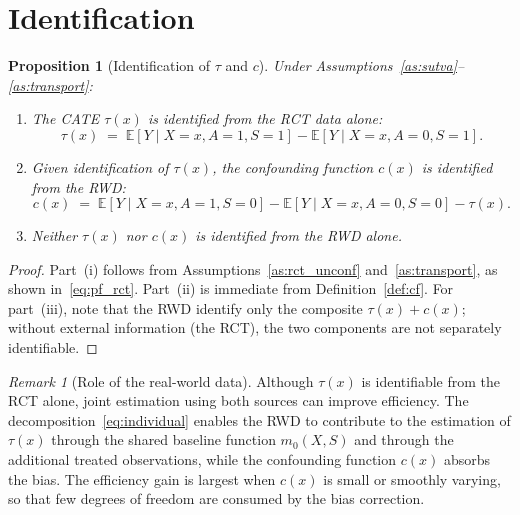 \documentclass[11pt]{article}
\theoremstyle{plain}
\theoremstyle{definition}
\theoremstyle{remark}
\newcommand{\E}{\mathbb{E}}
\newcommand{\1}{\mathds{1}}
\theoremstyle{plain}
\newtheorem{proposition}{Proposition}
\theoremstyle{remark}
\newtheorem{remark}{Remark}
\newcommand{\CATE}{\tau}
\newcommand{\cf}{c}
\begin{document}
\section{Identification}

\begin{proposition}[Identification of $\CATE$ and $\cf$]\label{prop:ident}
  Under Assumptions~\ref{as:sutva}--\ref{as:transport}:
  \begin{enumerate}
    \item[\emph{(i)}] The CATE $\CATE(x)$ is identified from the RCT data alone:
    \begin{equation}\label{eq:ident_tau}
      \CATE(x) \;=\; \E[Y \mid X{=}x, A{=}1, S{=}1] - \E[Y \mid X{=}x, A{=}0, S{=}1].
    \end{equation}
    \item[\emph{(ii)}] Given identification of $\CATE(x)$, the confounding function $\cf(x)$ is identified from the RWD:
    \begin{equation}\label{eq:ident_c}
      \cf(x) \;=\; \E[Y \mid X{=}x, A{=}1, S{=}0] - \E[Y \mid X{=}x, A{=}0, S{=}0] - \CATE(x).
    \end{equation}
    \item[\emph{(iii)}] Neither $\CATE(x)$ nor $\cf(x)$ is identified from the RWD alone.
  \end{enumerate}
\end{proposition}

\begin{proof}
  Part~(i) follows from Assumptions~\ref{as:rct_unconf} and~\ref{as:transport}, as shown in~\eqref{eq:pf_rct}. Part~(ii) is immediate from Definition~\ref{def:cf}. For part~(iii), note that the RWD identify only the composite $\CATE(x) + \cf(x)$; without external information (the RCT), the two components are not separately identifiable.
\end{proof}

\begin{remark}[Role of the real-world data]
  Although $\CATE(x)$ is identifiable from the RCT alone, joint estimation using both sources can improve efficiency. The decomposition~\eqref{eq:individual} enables the RWD to contribute to the estimation of $\CATE(x)$ through the shared baseline function $m_0(X,S)$ and through the additional treated observations, while the confounding function $\cf(x)$ absorbs the bias. The efficiency gain is largest when $\cf(x)$ is small or smoothly varying, so that few degrees of freedom are consumed by the bias correction.
\end{remark}
\end{document}
